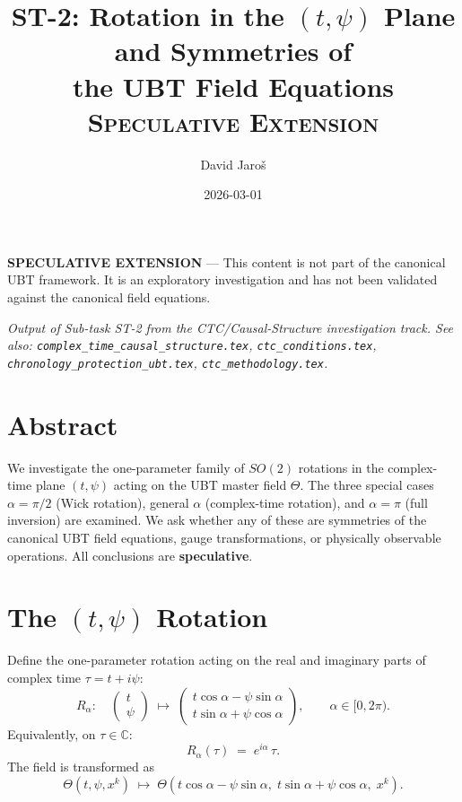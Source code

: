 \documentclass[12pt]{article}
\title{ST-2: Rotation in the $(t,\psi)$ Plane and Symmetries of\\
the UBT Field Equations\\[0.5em]
\large\textsc{Speculative Extension}}
\author{David Jaroš}
\date{2026-03-01}
\begin{document}
\maketitle

\begin{tcolorbox}[colback=yellow!10, title=Status]
\textbf{SPECULATIVE EXTENSION} — This content is not part of
the canonical UBT framework. It is an exploratory investigation
and has not been validated against the canonical field equations.
\end{tcolorbox}

\vspace{1em}
\noindent\textit{Output of Sub-task ST-2 from the CTC/Causal-Structure investigation track.
See also: \texttt{complex\_time\_causal\_structure.tex},
\texttt{ctc\_conditions.tex},
\texttt{chronology\_protection\_ubt.tex}, \texttt{ctc\_methodology.tex}.}

\section*{Abstract}
We investigate the one-parameter family of $SO(2)$ rotations in the
complex-time plane $(t,\psi)$ acting on the UBT master field $\Theta$.
The three special cases $\alpha = \pi/2$ (Wick rotation), general
$\alpha$ (complex-time rotation), and $\alpha = \pi$ (full inversion)
are examined.  We ask whether any of these are symmetries of the
canonical UBT field equations, gauge transformations, or physically
observable operations.  All conclusions are \textbf{speculative}.

\section{The $(t,\psi)$ Rotation}
Define the one-parameter rotation acting on the real and imaginary parts
of complex time $\tau = t + i\psi$:
\begin{equation}
  R_\alpha:\quad
  \begin{pmatrix} t \\ \psi \end{pmatrix}
  \;\longmapsto\;
  \begin{pmatrix} t\cos\alpha - \psi\sin\alpha \\
                  t\sin\alpha + \psi\cos\alpha \end{pmatrix},
  \qquad \alpha \in [0, 2\pi).
  \label{eq:rotation}
\end{equation}
Equivalently, on $\tau \in \mathbb{C}$:
\begin{equation}
  R_\alpha(\tau) \;=\; e^{i\alpha}\,\tau.
  \label{eq:complex_rotation}
\end{equation}
The field is transformed as
\begin{equation}
  \Theta(t,\psi,x^k) \;\longmapsto\;
  \Theta\!\left(t\cos\alpha - \psi\sin\alpha,\;
                t\sin\alpha + \psi\cos\alpha,\; x^k\right).
  \label{eq:field_transform}
\end{equation}
\end{document}
